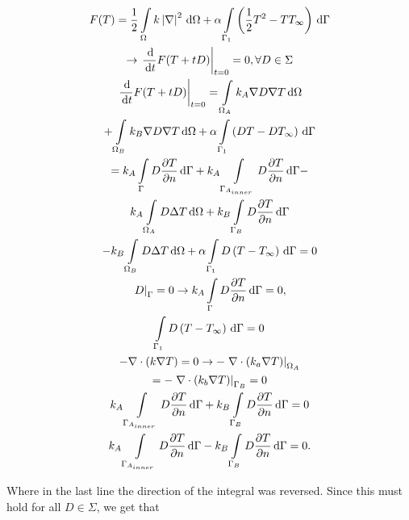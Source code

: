 \begin{gather*}
F(T) = \frac{1}{2}\int\displaylimits_{\Omega}k\left|\nabla\right|^2\,\mathrm{d}\Omega + \alpha \int\displaylimits_{\Gamma_1}\left(\frac{1}{2}T^2-TT_{\infty}\right)\,\mathrm{d}\Gamma\\
\rightarrow \left.\frac{\,\mathrm{d}}{\,\mathrm{d}t}F(T+tD)\right|_{t=0} = 0, \forall D \in \Sigma\\
\left.\frac{\,\mathrm{d}}{\,\mathrm{d}t}F(T+tD)\right|_{t=0} =  \int\displaylimits_{\Omega_A}k_A\nabla D \nabla T \,\mathrm{d}\Omega\\ + \int\displaylimits_{\Omega_B}k_B\nabla D \nabla T \,\mathrm{d}\Omega + \alpha \int\displaylimits_{\Gamma_1}\left(DT-DT_{\infty}\right)\,\mathrm{d}\Gamma\\
= k_A\int\displaylimits_{\Gamma}D\frac{\partial T}{\partial n}\,\mathrm{d}\Gamma + k_A\int\displaylimits_{\Gamma_{A_{inner}}}D\frac{\partial T}{\partial n}\,\mathrm{d}\Gamma - \\
k_A\int\displaylimits_{\Omega_A}D\Delta T \,\mathrm{d}\Omega + k_B \int\displaylimits_{\Gamma_B}D\frac{\partial T}{\partial n}\,\mathrm{d}\Gamma \\- k_B\int\displaylimits_{\Omega_B}D\Delta T \,\mathrm{d}\Omega + \alpha \int\displaylimits_{\Gamma_1}D\left(T-T_{\infty}\right)\,\mathrm{d}\Gamma = 0\\
\left.D\right|_{\Gamma} = 0 \rightarrow k_A\int\displaylimits_{\Gamma}D\frac{\partial T}{\partial n}\,\mathrm{d}\Gamma = 0,\\
\int\displaylimits_{\Gamma_1}D\left(T-T_{\infty}\right)\,\mathrm{d}\Gamma = 0\\
-\nabla \cdot (k\nabla T) = 0 \rightarrow -\left.\nabla \cdot (k_a\nabla T)\right|_{\Omega_A}\\
= -\left.\nabla \cdot (k_b\nabla T)\right|_{\Gamma_B} = 0\\
k_A\int\displaylimits_{\Gamma_{A_{inner}}}D\frac{\partial T}{\partial n} \,\mathrm{d}\Gamma + k_B\int\displaylimits_{\Gamma_{B}}D\frac{\partial T}{\partial n} \,\mathrm{d}\Gamma = 0\\
k_A\int\displaylimits_{\Gamma_{A_{inner}}}D\frac{\partial T}{\partial n} \,\mathrm{d}\Gamma - k_B\int\displaylimits_{\Gamma_{B}}D\frac{\partial T}{\partial n} \,\mathrm{d}\Gamma = 0.\\
\end{gather*}

Where in the last line the direction of the integral was reversed. Since this must hold for all $D \in \Sigma$, we get that

